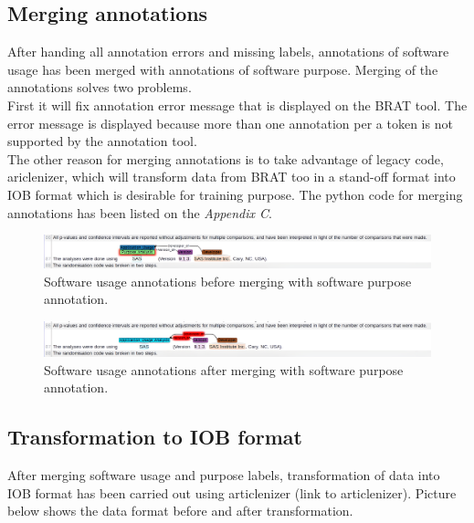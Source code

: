 \subsection{Merging annotations}
\label{subsec:dataset:preprocessing:Merging}

After handing all annotation errors and missing labels, annotations of software usage has been merged with annotations of software purpose. Merging of the annotations solves two problems. \\

First it will fix annotation error message that is displayed on the BRAT tool. The error message is displayed because more than one annotation per a token is not supported by the annotation tool. \\

The other reason for merging annotations is to take advantage of legacy code, ariclenizer, which will transform data from BRAT too in a stand-off format  into IOB format which is desirable for training purpose. The python code for merging annotations has been listed on the \emph{Appendix C}.

\begin{figure}[htbp]
	\centering
	\includegraphics[width=.95\textwidth]{4.graphics/figures/ch_4/2002515_plm_unm_HD}
	\caption{Software usage annotations before merging with software purpose  annotation.}
	
	\label{fig:chapter04:setup}
\end{figure}

\begin{figure}[htbp]
	\centering
	\includegraphics[width=.95\textwidth]{4.graphics/figures/ch_4/2002515_plm_HD}
	\caption{Software usage annotations after merging with software purpose  annotation.}
	\label{fig:chapter04:setup}
\end{figure}


\subsection{Transformation to IOB format}
\label{subsec:dataset:preprocessing:Transformation}
After merging software usage and purpose labels, transformation of data into IOB format has been carried out using articlenizer (link to articlenizer). Picture below shows the data format before and after transformation. \\


